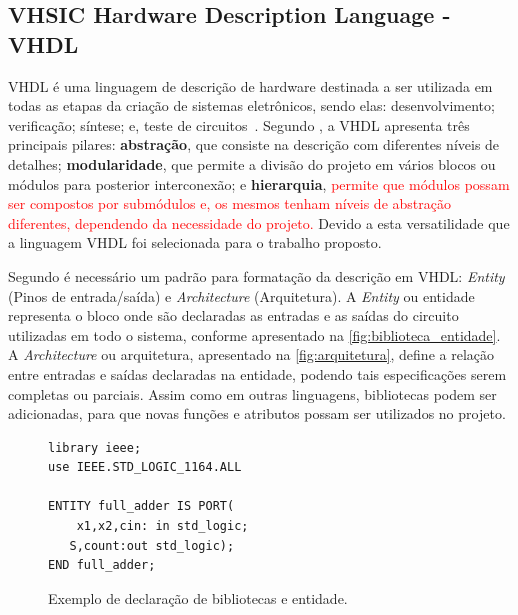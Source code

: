 

\subsection{\label{sec:vhdl_seção}VHSIC Hardware Description Language - VHDL}

VHDL é uma linguagem de descrição de hardware destinada a ser utilizada em todas as etapas da criação de sistemas eletrônicos, sendo elas: desenvolvimento; verificação; síntese; e, teste de circuitos~\cite{IEEEVHDLLanguage}.
% 
Segundo \cite{cappelattipraticando}, a VHDL apresenta três principais pilares: \textbf{abstração}, que consiste na descrição com diferentes níveis de detalhes; \textbf{modularidade}, que permite a divisão do projeto em vários blocos ou módulos para posterior interconexão; e \textbf{hierarquia}, \textcolor{red}{permite que módulos possam ser compostos por submódulos e, os mesmos tenham níveis de abstração diferentes, dependendo da necessidade do projeto.} Devido a esta versatilidade que a linguagem VHDL foi selecionada para o trabalho proposto.

\par
Segundo \cite{IEEEVHDLLanguage} é necessário um padrão para formatação da descrição em VHDL: \textit{Entity} (Pinos de entrada/saída) e \textit{Architecture} (Arquitetura). A \textit{Entity} ou entidade representa o bloco onde são declaradas as entradas e as saídas do circuito utilizadas em todo o sistema, conforme apresentado na \autoref{fig:biblioteca_entidade}. A \textit{Architecture} ou arquitetura, apresentado na \autoref{fig:arquitetura}, define a relação entre entradas e saídas declaradas na entidade, podendo tais especificações serem completas ou parciais. Assim como em outras linguagens, bibliotecas podem ser adicionadas, para que novas funções e atributos possam ser utilizados no projeto.

\begin{figure}[!htp]
\caption{\label{fig:biblioteca_entidade} Exemplo de declaração de bibliotecas e entidade.}
	\begin{center}
    \begin{minipage}{0.6\textwidth}
    \begin{lstlisting}       
library ieee;
use IEEE.STD_LOGIC_1164.ALL

ENTITY full_adder IS PORT(
	x1,x2,cin: in std_logic;
   S,count:out std_logic);
END full_adder;
\end{lstlisting}
    \end{minipage}
	\end{center}
\end{figure}

